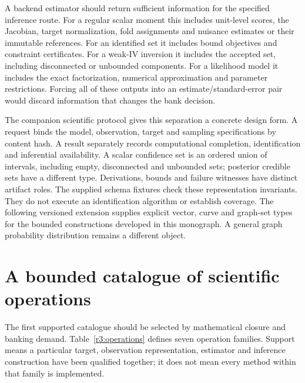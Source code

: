 A backend estimator should return sufficient information for the
specified inference route. For a regular scalar moment this includes
unit-level scores, the Jacobian, target normalization, fold assignments
and nuisance estimates or their immutable references. For an identified
set it includes bound objectives and constraint certificates. For a
weak-IV inversion it includes the accepted set, including disconnected
or unbounded components. For a likelihood model it includes the exact
factorization, numerical approximation and parameter restrictions.
Forcing all of these outputs into an estimate/standard-error pair would
discard information that changes the bank decision.

\label{r3:protocol}
The companion scientific protocol gives this separation a concrete design
form. A request binds the model, observation, target and sampling
specifications by content hash. A result separately records computational
completion, identification and inferential availability. A scalar
confidence set is an ordered union of intervals, including empty,
disconnected and unbounded sets; posterior credible sets have a different
type. Derivations, bounds and failure witnesses have distinct artifact
roles. The supplied schema fixtures check these representation invariants.
They do not execute an identification algorithm or establish coverage.
The following versioned extension supplies explicit vector, curve and graph-set
types for the bounded constructions developed in this monograph. A general
graph probability distribution remains a different object.



\section{A bounded catalogue of scientific operations}
\label{r3:operation-catalogue}

The first supported catalogue should be selected by mathematical closure
and banking demand. Table~\ref{r3:operations} defines seven operation
families. Support means a particular target, observation representation,
estimator and inference construction have been qualified together;
it does not mean every method within that family is implemented.

